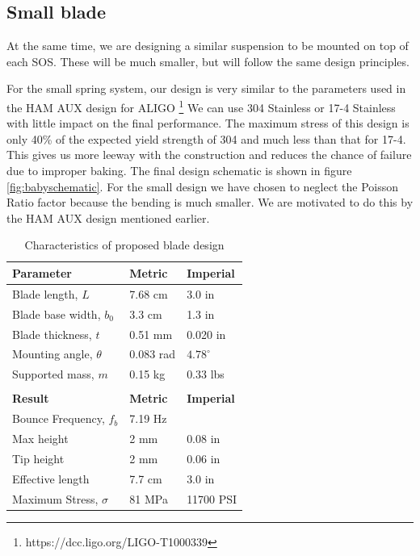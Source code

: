 \subsection{Small blade}

At the same time, we are designing a similar suspension to be mounted on top of each SOS.  These will be much smaller, but will follow the same design principles.


For the small spring system, our design is very similar to the parameters used in the HAM AUX design for ALIGO \footnote{https://dcc.ligo.org/LIGO-T1000339}  We can use 304 Stainless or 17-4 Stainless with little impact on the final performance.  The maximum stress of this design is only 40\% of the expected yield strength of 304 and much less than that for 17-4.  This gives us more leeway with the construction and reduces the chance of failure due to improper baking.  The final design schematic is shown in figure \ref{fig:babyschematic}.  For the small design we have chosen to neglect the Poisson Ratio factor because the bending is much smaller.  We are motivated to do this by the HAM AUX design mentioned earlier.

\begin{table}[ht]
\centering
\begin{tabular}{ l | l | l }
\bf{Parameter}& \bf{Metric} & \bf{Imperial} \\ \hline
Blade length, $L$ & 7.68 cm & 3.0 in \\ \hline
Blade base width, $b_0$ & 3.3 cm & 1.3 in \\ \hline
Blade thickness, $t$ & 0.51 mm & 0.020 in \\ \hline
Mounting angle, $\theta$ & 0.083 rad & $4.78^\circ$ \\ \hline
Supported mass, $m$ & 0.15 kg & 0.33 lbs\\\\
\bf{Result} & \bf{Metric} & \bf{Imperial} \\ \hline
Bounce Frequency, $f_b$ & 7.19 Hz \\ \hline
Max height & 2 mm & 0.08 in \\ \hline
Tip height & 2 mm & 0.06 in \\ \hline
Effective length & 7.7 cm & 3.0 in \\ \hline
Maximum Stress, $\sigma$ & 81 MPa & 11700 PSI
\end{tabular}
\caption{Characteristics of proposed blade design}
\label{tab:resultsBaby}
\end{table}

